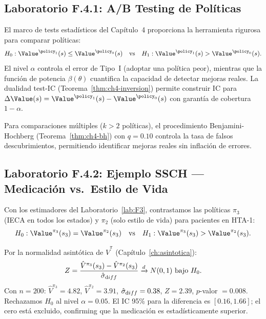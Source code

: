 \bigskip

\subsection*{Laboratorio F.4.1: A/B Testing de Políticas}

El marco de tests estadísticos del Capítulo~4 proporciona la herramienta
rigurosa para comparar políticas:
\[
    H_0: \Value^{\policy_1}(s) \leq \Value^{\policy_0}(s) \quad \text{vs} \quad
    H_1: \Value^{\policy_1}(s) > \Value^{\policy_0}(s).
\]
El nivel $\alpha$ controla el error de Tipo~I (adoptar una política peor),
mientras que la función de potencia $\beta(\theta)$ cuantifica la capacidad
de detectar mejoras reales. La dualidad test-IC
(Teorema~\ref{thm:ch4-inversion}) permite construir IC para
$\Delta\Value(s) = \Value^{\policy_1}(s) - \Value^{\policy_0}(s)$
con garantía de cobertura $1-\alpha$.

Para comparaciones múltiples ($k > 2$ políticas), el procedimiento
Benjamini-Hochberg (Teorema~\ref{thm:ch4-bh}) con $q=0.10$ controla la
tasa de falsos descubrimientos, permitiendo identificar mejoras reales sin
inflación de errores.

\subsection*{Laboratorio F.4.2: Ejemplo SSCH --- Medicación vs.\ Estilo de Vida}
\label{ex:ssch-cap04}

Con los estimadores del Laboratorio~\ref{lab:F3}, contrastamos las políticas
$\pi_3$ (IECA en todos los estados) y $\pi_2$ (solo estilo de vida) para
pacientes en HTA-1:
\[
    H_0: \Value^{\pi_3}(s_3) = \Value^{\pi_2}(s_3) \quad\text{vs}\quad
    H_1: \Value^{\pi_3}(s_3) > \Value^{\pi_2}(s_3).
\]

Por la normalidad asintótica de $\hat{V}^\pi$ (Capítulo~\ref{ch:asintotica}):
\[
    Z = \frac{\hat{V}^{\pi_3}(s_3) - \hat{V}^{\pi_2}(s_3)}{\hat\sigma_{\textrm diff}}
    \xrightarrow{d} N(0,1) \text{ bajo } H_0.
\]
Con $n=200$: $\hat{V}^{\pi_3}=4.82$, $\hat{V}^{\pi_2}=3.91$,
$\hat\sigma_{\textrm diff}=0.38$, $Z = 2.39$, $p$-valor $= 0.008$.
Rechazamos $H_0$ al nivel $\alpha=0.05$. El IC 95\% para la diferencia
es $[0.16, 1.66]$; el cero está excluido, confirming que la medicación
es estadísticamente superior.

